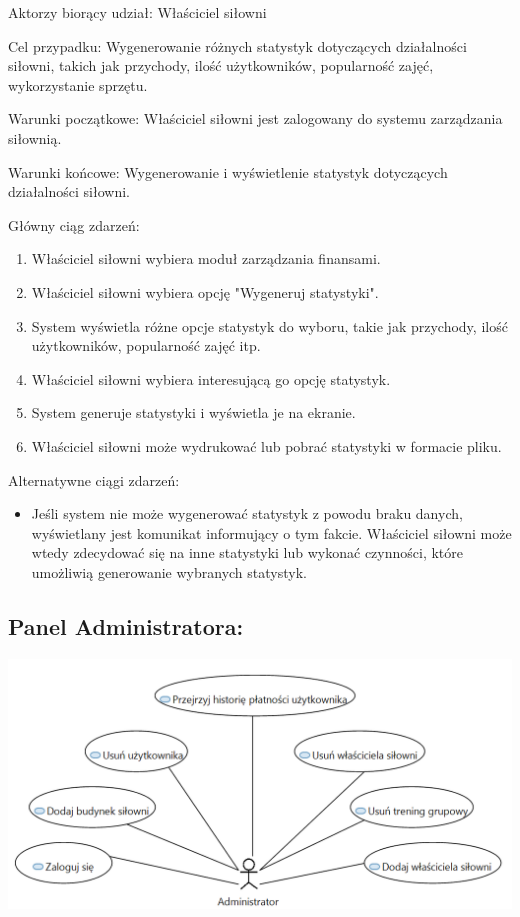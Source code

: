 \documentclass[
]{article}
\providecommand{\tightlist}{%
  \setlength{\itemsep}{0pt}\setlength{\parskip}{0pt}}
\begin{document}
{Aktorzy biorący udział: Właściciel siłowni}

{Cel przypadku: Wygenerowanie różnych statystyk dotyczących działalności
siłowni, takich jak przychody, ilość użytkowników, popularność zajęć,
wykorzystanie sprzętu.}

{Warunki początkowe: Właściciel siłowni jest zalogowany do systemu
zarządzania siłownią.}

{Warunki końcowe: Wygenerowanie i wyświetlenie statystyk dotyczących
działalności siłowni.}

{Główny ciąg zdarzeń:}

\begin{enumerate}
\tightlist
\item
  {Właściciel siłowni wybiera moduł zarządzania finansami.}
\item
  {Właściciel siłowni wybiera opcję "Wygeneruj statystyki".}
\item
  {System wyświetla różne opcje statystyk do wyboru, takie jak
  przychody, ilość użytkowników, popularność zajęć itp.}
\item
  {Właściciel siłowni wybiera interesującą go opcję statystyk.}
\item
  {System generuje statystyki i wyświetla je na ekranie.}
\item
  {Właściciel siłowni może wydrukować lub pobrać statystyki w formacie
  pliku.}
\end{enumerate}

{Alternatywne ciągi zdarzeń:}

\begin{itemize}
\tightlist
\item
  {Jeśli system nie może wygenerować statystyk z powodu braku danych,
  wyświetlany jest komunikat informujący o tym fakcie. Właściciel
  siłowni może wtedy zdecydować się na inne statystyki lub wykonać
  czynności, które umożliwią generowanie wybranych statystyk.}
\end{itemize}

\hypertarget{h.sjnlhh288rjz}{%
\subsection{\texorpdfstring{{Panel
Administratora:}}{Panel Administratora:}}\label{h.sjnlhh288rjz}}

{\includegraphics{diagrams/use_cases/administrator.png}}
\end{document}
